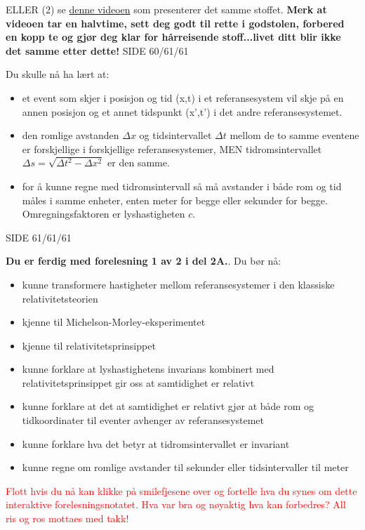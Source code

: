 \documentclass{beamer}
\let\hrefori\href
\renewcommand{\href}[2]{{\setlength{\fboxsep}{1pt}\colorbox{sunset}{\hrefori{#1}{#2}}}}
\newcommand{\pagebutton}[1]{\setbeamertemplate{button}{\tikz\node[inner xsep = 5pt, draw = structure!90, fill = green(ryb), rounded corners = 8pt]{\color{amber}\Large\insertbuttontext};}\beamerbutton{#1}}
\begin{document}
\begin{frame}
{ELLER (2) se \href{https://www.uio.no/studier/emner/matnat/astro/AST2000/h20/undervisningsmateriell/interaktive-forelesningsnotater/2a/videoer/video2a_3.mp4}{denne videoen} som presenterer det samme stoffet. {\bf Merk at videoen tar en halvtime, sett deg godt til rette i godstolen, forbered en kopp te og gjør deg klar for hårreisende stoff...livet ditt blir ikke det samme etter dette!}
}{SIDE 60/61/61}

{
\large
Du skulle nå ha lært at:
\begin{itemize}
\item et event som skjer i posisjon og tid (x,t) i et referansesystem vil skje på en annen posisjon og et annet tidspunkt (x',t') i det andre referansesystemet.
\item den romlige avstanden $\Delta x$ og tidsintervallet $\Delta t$ mellom de to samme eventene er forskjellige i forskjellige referansesystemer, MEN tidromsintervallet $\Delta s=\sqrt{\Delta t^2-\Delta x^2}$ er den samme.
\item for å kunne regne med tidromsintervall så må avstander i både rom og tid måles i samme enheter, enten meter for begge eller sekunder for begge. Omregningsfaktoren er lyshastigheten $c$.
\end{itemize}
}{SIDE 61/61/61}

\hyperlink{tog27}{\pagebutton{\small Forrige side}}\href{https://nettskjema.no/a/170171}{ \Changey[1][yellow]{-2}}
{\bf Du er ferdig med forelesning 1 av 2 i del 2A.}. Du bør nå:
\begin{itemize}
\item kunne transformere hastigheter mellom referansesystemer i den klassiske relativitetsteorien
\item kjenne til Michelson-Morley-eksperimentet
\item kjenne til relativitetsprinsippet
\item kunne forklare at lyshastighetens invarians kombinert med relativitetsprinsippet gir oss at samtidighet er relativt
\item kunne forklare at det at samtidighet er relativt gjør at både rom og tidkoordinater til eventer avhenger av referansesystemet
\item kunne forklare hva det betyr at tidromsintervallet er invariant
\item kunne regne om romlige avstander til sekunder eller tidsintervaller til meter
\end{itemize}
\textcolor{red}{Flott hvis du nå kan klikke på smilefjesene over og fortelle hva du synes om dette interaktive forelesningsnotatet. Hva var bra og nøyaktig hva kan forbedres? All ris og ros mottaes med takk!}
\end{frame}
\end{document}
